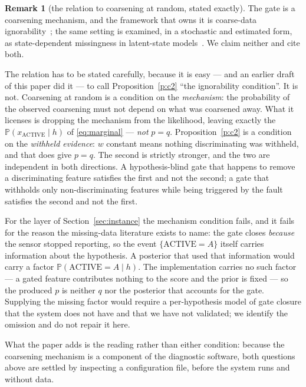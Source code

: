 \documentclass[11pt,a4paper]{article}
\theoremstyle{definition}
\newtheorem{remark}{Remark}
\begin{document}
\begin{remark}[the relation to coarsening at random, stated
exactly]\label{r:car}
The gate is a coarsening mechanism, and the framework that owns it is
coarse-data ignorability~\cite{heitjan1991car}; the same setting is examined,
in a stochastic and estimated form, as state-dependent missingness in
latent-state models~\cite{speekenbrink2025statedep}. We claim neither and cite
both.

The relation has to be stated carefully, because it is easy --- and an earlier
draft of this paper did it --- to call Proposition~\ref{p:c2} ``the
ignorability condition''. It is not. Coarsening at random is a condition on
the \emph{mechanism}: the probability of the observed coarsening must not
depend on what was coarsened away. What it licenses is dropping the mechanism
from the likelihood, leaving exactly the $\mathbb{P}(x_{\mathrm{ACTIVE}}\mid
h)$ of \eqref{eq:marginal} --- \emph{not} $p=q$. Proposition~\ref{p:c2} is a
condition on the \emph{withheld evidence}: $w$ constant means nothing
discriminating was withheld, and that does give $p=q$. The second is strictly
stronger, and the two are independent in both directions. A hypothesis-blind
gate that happens to remove a discriminating feature satisfies the first and
not the second; a gate that withholds only non-discriminating features while
being triggered by the fault satisfies the second and not the first.

For the layer of Section~\ref{sec:instance} the mechanism condition fails, and
it fails for the reason the missing-data literature exists to name: the gate
closes \emph{because} the sensor stopped reporting, so the event
$\{\mathrm{ACTIVE}=A\}$ itself carries information about the hypothesis. A
posterior that used that information would carry a factor
$\mathbb{P}(\mathrm{ACTIVE}=A\mid h)$. The implementation carries no such
factor --- a gated feature contributes nothing to the score and the prior is
fixed --- so the produced $p$ is neither $q$ nor the posterior that accounts
for the gate. Supplying the missing factor would require a per-hypothesis
model of gate closure that the system does not have and that we have not
validated; we identify the omission and do not repair it here.

What the paper adds is the reading rather than either condition: because the
coarsening mechanism is a component of the diagnostic software, both questions
above are settled by inspecting a configuration file, before the system runs
and without data.
\end{remark}
\end{document}
